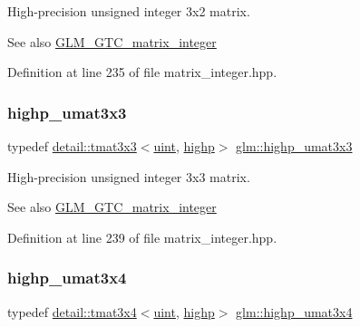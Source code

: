 High-\/precision unsigned integer 3x2 matrix. \begin{DoxySeeAlso}{See also}
\hyperlink{group__gtc__matrix__integer}{G\+L\+M\+\_\+\+G\+T\+C\+\_\+matrix\+\_\+integer} 
\end{DoxySeeAlso}


Definition at line 235 of file matrix\+\_\+integer.\+hpp.

\mbox{\label{group__gtc__matrix__integer_ga8dd9f8bfe06de34c8f1a942d2c2e094c}} 
\subsubsection{\texorpdfstring{highp\+\_\+umat3x3}{highp\_umat3x3}}
{\footnotesize\ttfamily typedef \hyperlink{structglm_1_1detail_1_1tmat3x3}{detail\+::tmat3x3}$<$\hyperlink{group__core__precision_ga4fd29415871152bfb5abd588334147c8}{uint}, \hyperlink{namespaceglm_a0f04f086094c747d227af4425893f545ac6f7eab42eacbb10d59a58e95e362074}{highp}$>$ \hyperlink{group__gtc__matrix__integer_ga8dd9f8bfe06de34c8f1a942d2c2e094c}{glm\+::highp\+\_\+umat3x3}}

High-\/precision unsigned integer 3x3 matrix. \begin{DoxySeeAlso}{See also}
\hyperlink{group__gtc__matrix__integer}{G\+L\+M\+\_\+\+G\+T\+C\+\_\+matrix\+\_\+integer} 
\end{DoxySeeAlso}


Definition at line 239 of file matrix\+\_\+integer.\+hpp.

\mbox{\label{group__gtc__matrix__integer_gabaeb2363acd07cc7f99918bae48ccc05}} 
\subsubsection{\texorpdfstring{highp\+\_\+umat3x4}{highp\_umat3x4}}
{\footnotesize\ttfamily typedef \hyperlink{structglm_1_1detail_1_1tmat3x4}{detail\+::tmat3x4}$<$\hyperlink{group__core__precision_ga4fd29415871152bfb5abd588334147c8}{uint}, \hyperlink{namespaceglm_a0f04f086094c747d227af4425893f545ac6f7eab42eacbb10d59a58e95e362074}{highp}$>$ \hyperlink{group__gtc__matrix__integer_gabaeb2363acd07cc7f99918bae48ccc05}{glm\+::highp\+\_\+umat3x4}}

